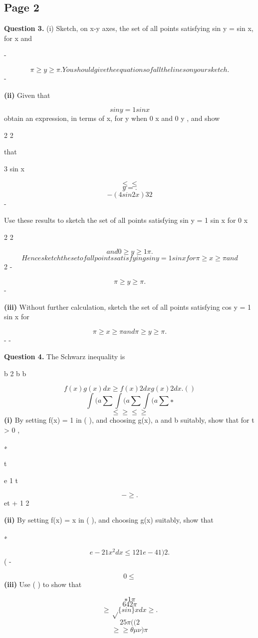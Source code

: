 \documentclass[12pt]{article}
\begin{document}
\subsection*{Page 2}
\begin{flushleft}
\bigskip\textbf{Question 3.} (i) Sketch, on x-y axes, the set of all points satisfying sin y = sin x, for \pi \geq x \geq \pi and\par
-\par
\[\pi \geq y \geq \pi. You should give the equations of all the lines on your sketch.\]
-\par
\textbf{(ii)} Given that\par
\[sin y = 1 sin x\]
obtain an expression, in terms of x, for y \leq when 0 \geq x  \pi and 0 \geq y  \pi, and show\par
2 2\par
that\par
3 sin x\par
\[\leq\leq\]
\[y = .\]
\[- (4 sin2 x) 3 2\]
-\par
Use these results to sketch the set of all points satisfying sin y = 1 sin x for 0 \geq x  \pi\par
2 2\par
\[and 0 \geq y \geq 1 \pi.\]
\[Hence sketch the set of all points satisfying sin y = 1 sin x for \pi \geq x \geq \pi and\]
2 -\par
\[\pi \geq y \geq \pi .\]
-\par
\textbf{(iii)} Without further calculation, sketch the set of all points satisfying cos y = 1 sin x for\par
\[\pi \geq x \geq \pi and \pi \geq y \geq \pi.\]
- -\par
\bigskip\textbf{Question 4.} The Schwarz inequality is\par
b 2 b b\par
\[f(x) g(x) dx \geq f(x) 2 dx g(x) 2 dx . ( )\]
\[\int(a \sum \int(a \sum \int(a \sum ∗\]
\[\leq \geq \leq \geq\]
\textbf{(i)} By setting f(x) = 1 in ( ), and choosing g(x), a and b suitably, show that for t > 0 ,\par
∗\par
t\par
e 1 t\par
\[- \geq .\]
et + 1 2\par
\textbf{(ii)} By setting f(x) = x in ( ), and choosing g(x) suitably, show that\par
∗\par
\[e - 2 1 x^2 dx \leq 12 1 e - 4 1 )2 .\]
( -\par
\[0 \leq\]
\textbf{(iii)} Use ( ) to show that\par
\[∗ 1 \pi\]
\[64 2 \pi\]
\[\geq \sqrt\{sin\} x dx \geq .\]
\[25\pi ( ( 2\]
\[\geq\geq\theta\mu\nu) \pi\]
\end{flushleft}
\end{document}
